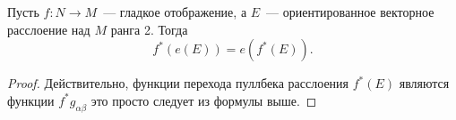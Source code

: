	 \begin{statement} 
	 	Пусть $f\colon N \to M$~--- гладкое отображение, а $E$~--- ориентированное векторное расслоение над $M$ ранга 2. Тогда 
	 	\[
	 		f^{*}(e(E)) = e(f^{*}(E)).
	 	\]
	 \end{statement}
	 \begin{proof}
	 	Действительно, функции перехода пуллбека расслоения $f^{*}(E)$ являются функции $f^*g_{\alpha \beta}$ это просто следует из формулы выше. 
 	 \end{proof}

 	 


	 








